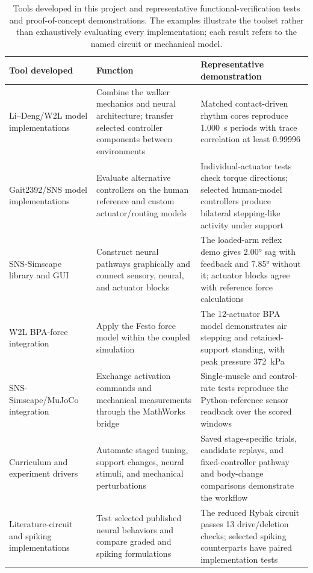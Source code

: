 \documentclass[11pt]{report}
\begin{document}
\clearpage
\begin{table}[htbp]
\caption[Tools developed and representative demonstrations]{Tools developed in this project and representative functional-verification tests and proof-of-concept demonstrations. The examples illustrate the toolset rather than exhaustively evaluating every implementation; each result refers to the named circuit or mechanical model.}
\label{tab:sns_capability}
\small
\begin{tabularx}{\textwidth}{@{}>{\raggedright\arraybackslash}p{}*{2}{>{\raggedright\arraybackslash}X}@{}}
\toprule
\textbf{Tool developed} & \textbf{Function} & \textbf{Representative demonstration} \\
\midrule
Li--Deng/W2L model implementations & Combine the walker mechanics and neural architecture; transfer selected controller components between environments & Matched contact-driven rhythm cores reproduce \qty{1.000}{\second} periods with trace correlation at least 0.99996 \\
Gait2392/SNS model implementations & Evaluate alternative controllers on the human reference and custom actuator/routing models & Individual-actuator tests check torque directions; selected human-model controllers produce bilateral stepping-like activity under support \\
SNS-Simscape library and GUI & Construct neural pathways graphically and connect sensory, neural, and actuator blocks & The loaded-arm reflex demo gives \ang{2.00} sag with feedback and \ang{7.85} without it; actuator blocks agree with reference force calculations \\
W2L BPA-force integration & Apply the Festo force model within the coupled simulation & The 12-actuator BPA model demonstrates air stepping and retained-support standing, with peak pressure \qty{372}{\kPa} \\
SNS-Simscape/MuJoCo integration & Exchange activation commands and mechanical measurements through the MathWorks bridge & Single-muscle and control-rate tests reproduce the Python-reference sensor readback over the scored windows \\
Curriculum and experiment drivers & Automate staged tuning, support changes, neural stimuli, and mechanical perturbations & Saved stage-specific trials, candidate replays, and fixed-controller pathway and body-change comparisons demonstrate the workflow \\
Literature-circuit and spiking implementations & Test selected published neural behaviors and compare graded and spiking formulations & The reduced Rybak circuit passes 13 drive/deletion checks; selected spiking counterparts have paired implementation tests \\
\bottomrule
\end{tabularx}
\end{table}
\end{document}
